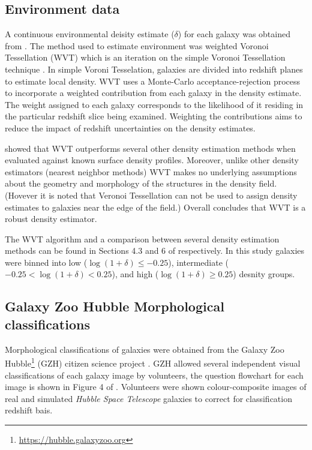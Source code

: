 \documentclass[a4paper,fleqn,usenatbib]{mnras}
\begin{document}
   \subsection{Environment data}
  
   A continuous environmental deisity estimate ($\delta$) for each galaxy was obtained from \cite{darvish2015}.
   The method used to estimate environment was weighted Voronoi Tessellation (WVT) which is an iteration 
   on the simple Voronoi Tessellation technique \citep{ebeling1993,bernardeau1996}. In simple Voroni 
   Tesselation, galaxies are divided into redshift planes to estimate local density. WVT uses a Monte-Carlo 
   acceptance-rejection process to incorporate a weighted contribution from each galaxy in the density
   estimate. The weight assigned to each galaxy corresponds to the likelihood of it residing in the 
   particular redshift slice being examined. Weighting the contributions aims to reduce the impact of 
   redshift uncertainties on the density estimates.

   \cite{darvish2015} showed that WVT outperforms several other density estimation methods when evaluated 
   against known surface density profiles. Moreover, unlike other density estimators (nearest neighbor methods) 
   WVT makes no underlying assumptions about the geometry and morphology of the structures in the density field. 
   (Hovever it is noted that Veronoi Tessellation can not be used to assign density estimates to galaxies near the
   edge of the field.) Overall \cite{darvish2015} concludes that WVT is a robust density estimator. 

   The WVT algorithm and a comparison between several density estimation methods can be found 
   in Sections 4.3 and 6 of \cite{darvish2015} respectively. In this study galaxies were binned into low
   ($\log(1+\delta)\leq-0.25$), intermediate ($-0.25 <\log(1+\delta)< 0.25$), and high ($\log(1+\delta)\geq0.25$)
   desnity groups.

   \subsection{Galaxy Zoo Hubble Morphological classifications}
   
   Morphological classifications of galaxies were obtained from the Galaxy Zoo Hubble\footnote{\url{https://hubble.galaxyzoo.org}} (GZH) citizen 
   science project \citep{galaxyzooHubble}. GZH allowed several independent visual classifications of each galaxy image by volunteers, the question flowchart for each
   image is shown in Figure 4 of \cite{galaxyzooHubble}. Volunteers were shown colour-composite images of real and simulated \textit{Hubble Space Telescope} galaxies to
   correct for classification redshift bais. 
\end{document}

